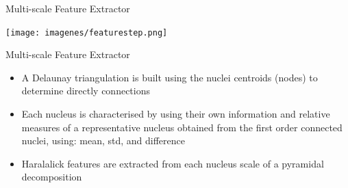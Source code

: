 \documentclass[usenames,dvipsnames]{beamer}
\begin{document}
\begin{frame}{Multi-scale Feature Extractor}

\centering\texttt{[image: imagenes/featurestep.png]}
    
\end{frame}


\begin{frame}{Multi-scale Feature Extractor}
 \begin{itemize}
     \item<1-> A Delaunay triangulation is built using the nuclei centroids (nodes) to determine directly connections
     \item<2-> Each nucleus is characterised by using their own information and relative measures of a representative nucleus obtained from the first order connected nuclei, using: mean, std, and  difference
     \item<3-> Haralalick features are extracted from each nucleus scale of a pyramidal decomposition
 \end{itemize}
\end{frame}
\end{document}
